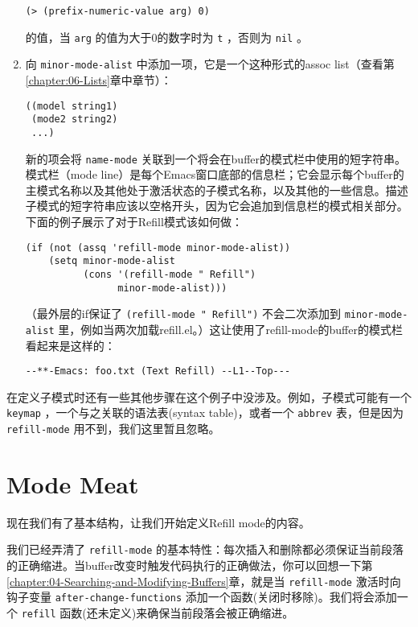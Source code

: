 \begin{enumerate}
\begin{verbatim}
(> (prefix-numeric-value arg) 0)
\end{verbatim}
的值，当 \texttt{arg} 的值为大于0的数字时为 \texttt{t} ，否则为 \texttt{nil} 。
  \item 向 \texttt{minor-mode-alist} 中添加一项，它是一个这种形式的assoc list（查看第\ref{chapter:06-Lists}章中章节）：
\begin{verbatim}
((model string1)
 (mode2 string2)
 ...)
\end{verbatim}
新的项会将 \texttt{name-mode} 关联到一个将会在buffer的模式栏中使用的短字符串。模式栏（mode line）是每个Emacs窗口底部的信息栏；它会显示每个buffer的主模式名称以及其他处于激活状态的子模式名称，以及其他的一些信息。描述子模式的短字符串应该以空格开头，因为它会追加到信息栏的模式相关部分。下面的例子展示了对于Refill模式该如何做：
\begin{verbatim}
(if (not (assq 'refill-mode minor-mode-alist))
    (setq minor-mode-alist
          (cons '(refill-mode " Refill")
                minor-mode-alist)))
\end{verbatim}
（最外层的if保证了 \texttt{(refill-mode " Refill")} 不会二次添加到 \texttt{minor-mode-alist} 里，例如当两次加载refill.el。）这让使用了refill-mode的buffer的模式栏看起来是这样的：
\begin{verbatim}
--**-Emacs: foo.txt (Text Refill) --L1--Top---
\end{verbatim}
\end{enumerate}

在定义子模式时还有一些其他步骤在这个例子中没涉及。例如，子模式可能有一个 \texttt{keymap} ，一个与之关联的语法表(syntax table)，或者一个 \texttt{abbrev} 表，但是因为 \texttt{refill-mode} 用不到，我们这里暂且忽略。

\section{Mode Meat}
\label{section:07-Mode-Meat}

现在我们有了基本结构，让我们开始定义Refill mode的内容。

我们已经弄清了 \texttt{refill-mode} 的基本特性：每次插入和删除都必须保证当前段落的正确缩进。当buffer改变时触发代码执行的正确做法，你可以回想一下第\ref{chapter:04-Searching-and-Modifying-Buffers}章，就是当 \texttt{refill-mode} 激活时向钩子变量 \texttt{after-change-functions} 添加一个函数(关闭时移除)。我们将会添加一个 \texttt{refill} 函数(还未定义)来确保当前段落会被正确缩进。

